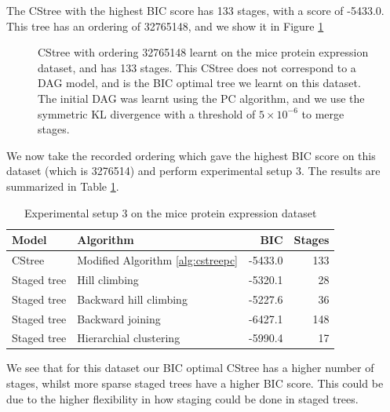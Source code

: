 \documentclass{tufte-book}
\begin{document}
The CStree with the highest BIC score has 133 stages, with a score of -5433.0. This tree has an ordering of 32765148, and we show it in Figure \ref{fig:micemaxbic}
\begin{figure}[!h]\label{fig:micemaxbic}
   \begin{floatrow}
%
\caption{CStree with ordering 32765148 learnt on the mice protein expression dataset, and has 133 stages. This CStree does not correspond to a DAG model, and is the BIC optimal tree we learnt on this dataset. The initial DAG was learnt using the PC algorithm, and we use the symmetric KL divergence with a threshold of $5\times 10^{-6}$ to merge stages.}
        
   \end{floatrow}
\end{figure}

We now take the recorded ordering which gave the highest BIC score on this dataset (which is 3276514) and perform experimental setup 3. The results are summarized in Table \ref{tab:orgc3e6585}.

\begin{table}[htbp]
\caption{\label{tab:orgc3e6585}Experimental setup 3 on the mice protein expression dataset}
\centering
\begin{tabular}{l|l|r|r}
\hline
Model & Algorithm & BIC & Stages\\
\hline
CStree & Modified Algorithm \ref{alg:cstreepc} & -5433.0 & 133\\
Staged tree & Hill climbing & -5320.1 & 28\\
Staged tree & Backward hill climbing & -5227.6 & 36\\
Staged tree & Backward joining & -6427.1 & 148\\
Staged tree & Hierarchial clustering & -5990.4 & 17\\
\end{tabular}
\end{table}

We see that for this dataset our BIC optimal CStree has a higher number of stages, whilst more sparse staged trees have a higher BIC score. This could be due to the higher flexibility in how staging could be done in staged trees.
\end{document}
